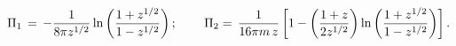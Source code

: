 \begin{equation}
\Pi _{1} \,=\,-\frac{1}{8\pi z^{1/2}}\ln \left( \frac{%
1+z^{1/2}}{1-z^{1/2}}\right) ;\,\qquad \Pi _{2}=\,\frac{1}{16\pi m\, z}\left[ 1-\left(
\frac{1+z}{2 z^{1/2}}\right)\ln \left( \frac{%
1+z^{1/2}}{1-z^{1/2}}\right)  \right] .
\end{equation}

